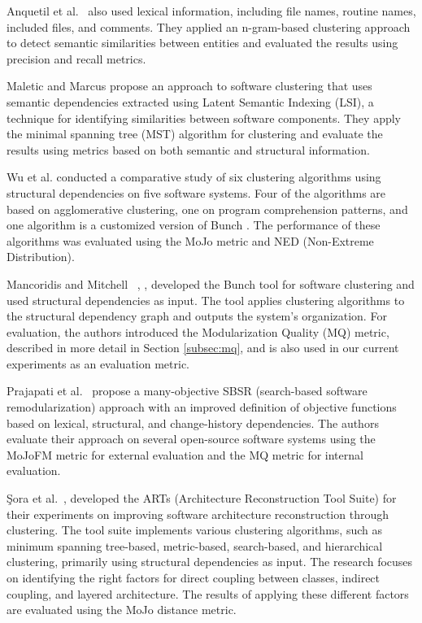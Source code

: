 \documentclass{ieeeaccess}
\begin{document}
Anquetil et al.~\cite{b14} also used lexical information, including file names, routine names, included files, and comments. They applied an n-gram-based clustering approach to detect semantic similarities between entities and evaluated the results using precision and recall metrics.

Maletic and Marcus \cite{maletic} propose an approach to software clustering that uses semantic dependencies extracted using Latent Semantic Indexing (LSI), a technique for identifying similarities between software components. They apply the minimal spanning tree (MST) algorithm for clustering and evaluate the results using metrics based on both semantic and structural information.

Wu et al. \cite{wu} conducted a comparative study of six clustering algorithms using structural dependencies on five software systems. Four of the algorithms are based on agglomerative clustering, one on program comprehension patterns, and one algorithm is a customized version of Bunch \cite{b10}. The performance of these algorithms was evaluated using the MoJo metric and NED (Non-Extreme Distribution).

Mancoridis and Mitchell ~\cite{b10}, \cite{b101}, \cite{bunch} developed the Bunch tool for software clustering and used structural dependencies as input. The tool applies clustering algorithms to the structural dependency graph and outputs the system's organization. For evaluation, the authors introduced the Modularization Quality (MQ) metric, described in more detail in Section \ref{subsec:mq}, and is also used in our current experiments as an evaluation metric.


Prajapati et al.~\cite{b18} propose a many-objective SBSR (search-based software remodularization) approach with an improved definition of objective functions based on lexical, structural, and change-history dependencies. The authors evaluate their approach on several open-source software systems using the MoJoFM metric for external evaluation and the MQ metric for internal evaluation.

Şora et al.~\cite{b12}, \cite{b19} developed the ARTs (Architecture Reconstruction Tool Suite) for their experiments on improving software architecture reconstruction through clustering. The tool suite implements various clustering algorithms, such as minimum spanning tree-based, metric-based, search-based, and hierarchical clustering, primarily using structural dependencies as input. The research focuses on identifying the right factors for direct coupling between classes, indirect coupling, and layered architecture. The results of applying these different factors are evaluated using the MoJo distance metric.
\end{document}
